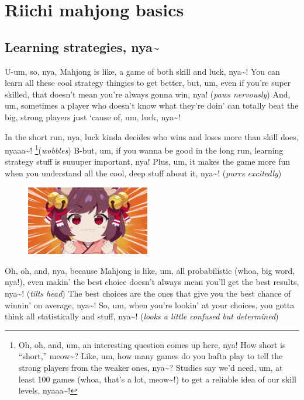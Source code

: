 \clearpage
\chapter{Riichi mahjong basics}\label{ch:basic}
\thispagestyle{empty}

\section*{Learning strategies, nya\textasciitilde}

U-um, so, nya, Mahjong is like, a game of both skill and luck, nya\textasciitilde! You
can learn all these cool strategy thingies to get better, but, um, even if
you’re super skilled, that doesn’t mean you’re always gonna win, nya! (\textit{paws
nervously}) And, um, sometimes a player who doesn’t know what they’re doin’
can totally beat the big, strong players just ‘cause of, um, luck, nya\textasciitilde!

In the short run, nya, luck kinda decides who wins and loses more than skill
does, nyaaa\textasciitilde! \footnote{
Oh, oh, and, um, an interesting question comes up here, nya! How short is
“short,” meow\textasciitilde? Like, um, how many games do you hafta play to tell the strong
players from the weaker ones, nya\textasciitilde? Studies say we’d need, um, at least 100
games (whoa, that’s a lot, meow\textasciitilde!) to get a reliable idea of our skill levels,
nyaaa\textasciitilde!
}(\textit{wobbles})
B-but, um, if you wanna be good in the long run, learning strategy stuff is
suuuper important, nya! Plus, um, it makes the game more fun when you
understand all the cool, deep stuff about it, nya\textasciitilde! (\textit{purrs excitedly})

\begin{figure}
    \centering
    \includegraphics[width=0.48\textwidth]{images/ichipumped}
\end{figure}

Oh, oh, and, nya, because Mahjong is like, um, all probabilistic (whoa, big
word, nya!), even makin’ the best choice doesn’t always mean you’ll get the
best results, nya\textasciitilde! (\textit{tilts head}) The best choices are the ones that
give you the best chance of winnin’ on average, nya\textasciitilde! So, um, when you’re
lookin’ at your choices, you gotta think all statistically and stuff, nya\textasciitilde! (\textit{looks
a little confused but determined})

